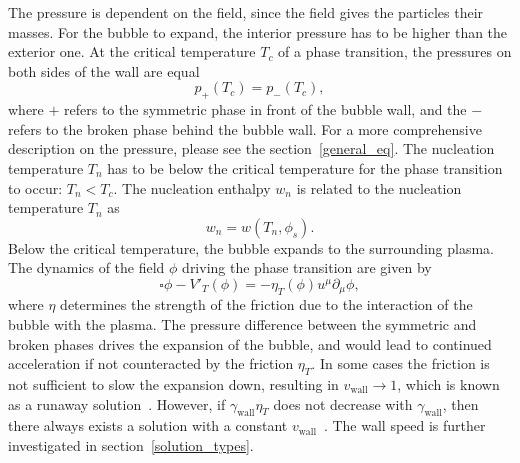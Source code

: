 The pressure is dependent on the field,
since the field gives the particles their masses.
For the bubble to expand, the interior pressure has to be higher than the exterior one.
At the critical temperature $T_c$ of a phase transition,
the pressures on both sides of the wall are equal
\begin{equation}
p_+(T_c) = p_-(T_c),
\label{eq:critical_temp}
\end{equation}
where $+$ refers to the symmetric phase in front of the bubble wall,
and the $-$ refers to the broken phase behind the bubble wall.
For a more comprehensive description on the pressure, please see the section~\ref{general_eq}.
The nucleation temperature $T_n$ has to be below the critical temperature for the phase transition to occur: $T_n < T_c$.
The nucleation enthalpy $w_n$ is related to the nucleation temperature $T_n$ as
\begin{equation}
w_n = w(T_n,\phi_s).
\label{eq:wn}
\end{equation}
Below the critical temperature, the bubble expands to the surrounding plasma.
The dynamics of the field $\phi$ driving the phase transition are given by
\cite[eq. 7.2]{lecture_notes}
\begin{equation}
\square \phi - V'_T(\phi) = - \eta_T(\phi) u^\mu \partial_\mu \phi,
\end{equation}
where $\eta$ determines the strength of the friction due to the interaction of the bubble with the plasma.
The pressure difference between the symmetric and broken phases drives the expansion of the bubble,
and would lead to continued acceleration if not counteracted by the friction $\eta_T$.
In some cases the friction is not sufficient to slow the expansion down,
resulting in $v_\text{wall} \rightarrow 1$,
which is known as a runaway solution~\cites{bodeker_can_2009}{bodeker_electroweak_2017}.
However, if $\gamma_\text{wall} \eta_T$ does not decrease with $\gamma_\text{wall}$,
then there always exists a solution with a constant $v_\text{wall}$~\cites{bodeker_electroweak_2017}{hoche_towards_2021}.
The wall speed is further investigated in section~\ref{solution_types}.
